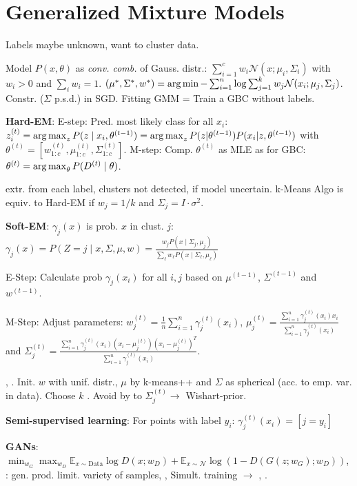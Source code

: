 \section{Generalized Mixture Models}
Labels maybe unknown, want to cluster data.

Model $P(x, \theta)$ as \emph{conv. comb.} of Gauss. distr.:
$\sum_{i=1}^c w_i \mathcal{N}(x; \mu_i, \Sigma_i)$ with $w_i > 0$ and $\sum_i w_i =
1$. $(\mu^*, \Sigma^*, w^*) = \operatorname*{arg\,min} - \sum_{i=1}^n \log \sum_{j=1}^k w_j \mathcal{N}(x_i; \mu_j,
\Sigma_j)$. Constr. ($\Sigma$ p.s.d.)  in SGD. Fitting GMM = Train a GBC without labels.

\textbf{Hard-EM}: E-step: Pred. most likely class for all $x_i$: $z_i^{(t)} = \operatorname*{arg\,max}_z P(z \mid
x_i, \theta^{(t-1)}) = \operatorname*{arg\,max}_z P(z | \theta^{(t-1)}) P(x_i | z, \theta^{(t-1)}) $ with $\theta^{(t)} = [w_{1:c}^{(t)}, \mu_{1:c}^{(t)}, \Sigma_{1:c}^{(t)}]$. M-step: Comp. $\theta^{(t)}$ as MLE as for GBC:
$\theta^{(t)} = \operatorname*{arg\,max}_\theta P(D^{(t)} \mid \theta)$.

 extr. from each label,  clusters
not detected,  if model uncertain. k-Means Algo is equiv. to Hard-EM if $w_j = 1/k$ and $\Sigma_j = I \cdot \sigma^2$.

\textbf{Soft-EM}: $\gamma_j(x)$ is prob. $x$ in clust. $j$: $\gamma_j(x) = P(Z = j \mid x, \Sigma, \mu, w) = \frac{w_j P(x \mid \Sigma_j, \mu_j)}{\sum_\ell w_\ell P(x \mid \Sigma_\ell, \mu_\ell)}$

E-Step: Calculate prob $\gamma_j(x_i)$ for all $i, j$ based on $\mu^{(t-1)}$,
$\Sigma^{(t-1)}$ and $w^{(t-1)}$.

M-Step: Adjust parameters: $w_j^{(t)} = \frac{1}{n} \sum_{i=1}^n \gamma_j^{(t)}(x_i)$, $\mu_j^{(t)} = \frac{\sum_{i=1}^n \gamma_j^{(t)}(x_i) x_i}{\sum_{i=1}^n  \gamma_j^{(t)}(x_i)}$ and
$\Sigma_j^{(t)} = \frac{\sum_{i=1}^n  \gamma_j^{(t)}(x_i) (x_i - \mu^{(t)}_j) (x_i -
\mu_j^{(t)})^T}{\sum_{i=1}^n \gamma_j^{(t)}(x_i)}$.

, . Init. $w$ with unif. distr., $\mu$ by k-means++ and $\Sigma$ as spherical (acc. to emp. var. in data). Choose $k$ . Avoid  by  to $\Sigma_j^{(t)}
\rightarrow$ Wishart-prior.

\textbf{Semi-supervised learning}: For points with label $y_i$: $\gamma_j^{(t)}(x_i) = [j = y_i]$

\textbf{GANs}: $\min_{w_G} \max_{w_D} \mathbb{E}_{x \sim \text{Data}} \log D(x; w_D) + \mathbb{E}_{x \sim \mathcal{N}} \log(1 - D(G(z; w_G); w_D))$, : gen. prod. limit. variety of samples, , Simult. training $\rightarrow$ , .
